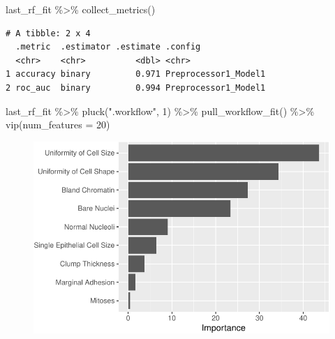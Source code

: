 \documentclass[
  letterpaper,
  DIV=11,
  numbers=noendperiod]{scrreprt}
\newenvironment{Shaded}{\begin{snugshade}}{\end{snugshade}}
\newcommand{\AttributeTok}[1]{\textcolor[rgb]{0.40,0.45,0.13}{#1}}
\newcommand{\DecValTok}[1]{\textcolor[rgb]{0.68,0.00,0.00}{#1}}
\newcommand{\FunctionTok}[1]{\textcolor[rgb]{0.28,0.35,0.67}{#1}}
\newcommand{\NormalTok}[1]{\textcolor[rgb]{0.00,0.23,0.31}{#1}}
\newcommand{\SpecialCharTok}[1]{\textcolor[rgb]{0.37,0.37,0.37}{#1}}
\newcommand{\StringTok}[1]{\textcolor[rgb]{0.13,0.47,0.30}{#1}}
\begin{document}
\begin{Shaded}
\begin{Highlighting}[]
\NormalTok{last\_rf\_fit }\SpecialCharTok{\%\textgreater{}\%} 
  \FunctionTok{collect\_metrics}\NormalTok{()}
\end{Highlighting}
\end{Shaded}

\begin{verbatim}
# A tibble: 2 x 4
  .metric  .estimator .estimate .config             
  <chr>    <chr>          <dbl> <chr>               
1 accuracy binary         0.971 Preprocessor1_Model1
2 roc_auc  binary         0.994 Preprocessor1_Model1
\end{verbatim}

\begin{Shaded}
\begin{Highlighting}[]
\NormalTok{last\_rf\_fit }\SpecialCharTok{\%\textgreater{}\%} 
  \FunctionTok{pluck}\NormalTok{(}\StringTok{".workflow"}\NormalTok{, }\DecValTok{1}\NormalTok{) }\SpecialCharTok{\%\textgreater{}\%}   
  \FunctionTok{pull\_workflow\_fit}\NormalTok{() }\SpecialCharTok{\%\textgreater{}\%} 
  \FunctionTok{vip}\NormalTok{(}\AttributeTok{num\_features =} \DecValTok{20}\NormalTok{)}
\end{Highlighting}
\end{Shaded}

\begin{figure}[H]

{\centering \includegraphics{./14-machine-learning_files/figure-pdf/unnamed-chunk-23-1.pdf}

}

\end{figure}
\end{document}
